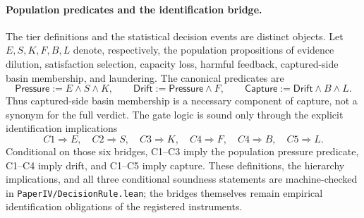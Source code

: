 \documentclass[11pt]{article}
\theoremstyle{definition}
\theoremstyle{remark}
\numberwithin{equation}{section}
\begin{document}
\paragraph{Population predicates and the identification bridge.} The tier definitions and the statistical decision events are distinct objects.  Let $E,S,K,F,B,L$ denote, respectively, the population propositions of evidence dilution, satisfaction selection, capacity loss, harmful feedback, captured-side basin membership, and laundering.  The canonical predicates are
\[
  \mathsf{Pressure}:=E\wedge S\wedge K,\qquad
  \mathsf{Drift}:=\mathsf{Pressure}\wedge F,\qquad
  \mathsf{Capture}:=\mathsf{Drift}\wedge B\wedge L.
\]
Thus captured-side basin membership is a necessary component of capture, not a synonym for the full verdict.  The gate logic is sound only through the explicit identification implications
\[
 C1\Rightarrow E,\quad C2\Rightarrow S,\quad C3\Rightarrow K,\quad
 C4\Rightarrow F,\quad C4\Rightarrow B,\quad C5\Rightarrow L.
\]
Conditional on those six bridges, C1--C3 imply the population pressure predicate, C1--C4 imply drift, and C1--C5 imply capture.  These definitions, the hierarchy implications, and all three conditional soundness statements are machine-checked in \texttt{PaperIV/DecisionRule.lean}; the bridges themselves remain empirical identification obligations of the registered instruments.
\end{document}
